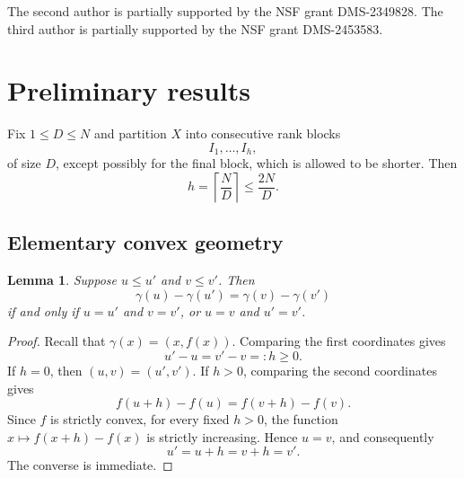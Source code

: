\documentclass{amsart}
\numberwithin{equation}{section}
\newtheorem{lemma}[theorem]{Lemma}
\begin{document}
The second author is partially supported by the NSF grant DMS-2349828.
The third author is partially supported by the NSF grant DMS-2453583.

\bigskip 


\section{Preliminary results}



Fix $1\leq D\leq N$ and partition $X$ into consecutive rank blocks
\begin{equation}
    \label{partition}
    I_1,\ldots,I_h,
\end{equation}
of size $D$, except possibly for the final block, which is allowed to be shorter. 
Then
\begin{equation}
    \nonumber
    h=\left\lceil\frac ND\right\rceil\leq\frac{2N}{D}.
\end{equation}

\bigskip 

\subsection{Elementary convex geometry}
\begin{lemma}
    \label{lem:pair-sum}
    Suppose $u\leq u'$ and $v\leq v'$.
    Then
    \begin{equation}
    \nonumber
        \gamma(u)-\gamma(u')=\gamma(v)-\gamma(v')
    \end{equation}
    if and only if $u=u'$ and $v=v'$, or $u=v$ and $u'=v'$.
\end{lemma}
\begin{proof}
    Recall that $\gamma(x)=(x,f(x))$.
    Comparing the first coordinates gives
    \[
    u'-u=v'-v=:h\geq 0.
    \]
    If \(h=0\), then \( (u,v)=(u',v')\).
    If \(h>0\), comparing the second coordinates gives
    \[
    f(u+h)-f(u)=f(v+h)-f(v).
    \]
    Since \(f\) is strictly convex, for every fixed \(h>0\), the function $x\longmapsto f(x+h)-f(x)$ is strictly increasing. 
    Hence \(u=v\), and consequently
    \[
    u'=u+h=v+h=v'.
    \]
    The converse is immediate.
\end{proof}
\end{document}
